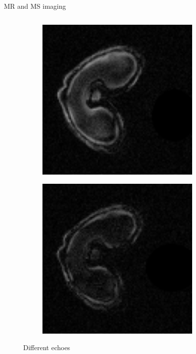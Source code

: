 \documentclass[10pt]{beamer}
\begin{document}
\begin{frame}{MR and MS imaging}
\begin{columns}
\begin{column}[t]{.5\textwidth}
\begin{figure}[ht]
\begin{subfigure}[t]{0.33\textwidth}
          \centering \includegraphics[width=0.9\textwidth]{fig/echo2_2}
        \end{subfigure}%
        \begin{subfigure}[t]{0.33\textwidth}
          \centering \includegraphics[width=0.9\textwidth]{fig/echo2_3}
        \end{subfigure}%
        \caption{Different echoes}
      \end{figure}

\end{column}
\end{columns}
\end{frame}
\end{document}
